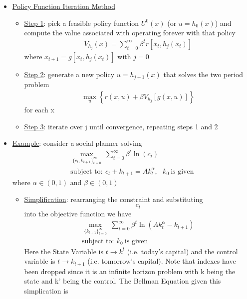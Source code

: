 \documentclass{article}
\begin{document}
\begin{itemize}
\begin{itemize}
    \end{itemize}
    \item  \underline{Policy Function Iteration Method}
    \begin{itemize}
        \item  \underline{Step 1}: pick a feasible policy function $U^{0}(x)$ (or $u = h_{0}(x)$) and compute the value associated with operating forever with that policy
        \begin{gather*}
            V_{h_{j}}(x) = \sum_{t=0}^{\infty} \beta^{t} r [x_{t}, h_{j}(x_{t})]
        \end{gather*}
        where $x_{t+1} = g[x_{t}, h_{j}(x_{t})]$ with $j=0$
        \item  \underline{Step 2}: generate a new policy $u = h_{j+1}(x)$ that solves the two period problem
        \begin{gather*}
            \max_{u} \left\{r(x,u) + \beta V_{h_{j}} [g(x,u)]\right\}
        \end{gather*}
        for each x
        \item  \underline{Step 3}: iterate over j until convergence, repeating steps 1 and 2
    \end{itemize}
    \item  \underline{Example}: consider a social planner solving
    \begin{gather*}
    \max_{\{c_{t}, k_{t+1} \}_{t=0}^{\infty}} \ \sum_{t=0}^{\infty} \beta^{t} \ln (c_{t}) \\
    \text{subject to}: \ c_{t} + k_{t+1} = Ak_{t}^{\alpha}, \ \ \ k_{0} \ \text{is given}
    \end{gather*}
    where $\alpha \in (0,1)$ and $\beta \in (0,1)$
    \begin{itemize}
        \item \underline{Simplification}: rearranging the constraint and substituting $$c_{t}$$ into the objective function we have
        \begin{gather*}
        \max_{\{k_{t+1} \}_{t=0}^{\infty}} \ \sum_{t=0}^{\infty} \beta^{t} \ln (Ak_{t}^{\alpha} − k_{t+1}) \\
        \text{subject to}: \ k_{0} \ \text{is given}
        \end{gather*}
        Here the State Variable is $t \rightarrow k^{t}$ (i.e. today's capital) and the control variable is $t \rightarrow k_{t+1}$ (i.e. tomorrow's capital). Note that indexes have been dropped since it is an infinite horizon problem with k being the state and k' being the control. The Bellman Equation given this simplication is

\end{itemize}
\end{itemize}
\end{document}
